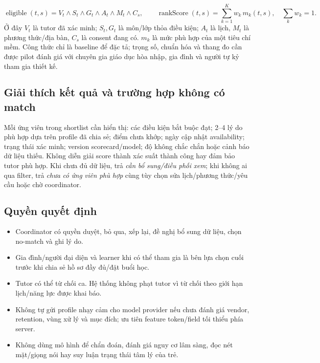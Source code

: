 \documentclass[11pt,a4paper]{article}
\begin{document}
\[
\operatorname{eligible}(t,s)=V_t\land S_t\land G_t\land A_t\land M_t\land C_s,
\qquad
\operatorname{rankScore}(t,s)=\sum_{k=1}^{K}w_k\,m_k(t,s),\quad \sum_k w_k=1.
\]
Ở đây $V_t$ là tutor đã xác minh; $S_t,G_t$ là môn/lớp thỏa điều kiện; $A_t$ là lịch, $M_t$ là phương thức/địa bàn, $C_s$ là consent đang có. $m_k$ là mức phù hợp của một tiêu chí mềm. Công thức chỉ là baseline để đặc tả; trọng số, chuẩn hóa và thang đo cần được pilot đánh giá với chuyên gia giáo dục hòa nhập, gia đình và người tự kỷ tham gia thiết kế.

\subsection{Giải thích kết quả và trường hợp không có match}
Mỗi ứng viên trong shortlist cần hiển thị: các điều kiện bắt buộc đạt; 2--4 lý do phù hợp dựa trên profile đã chia sẻ; điểm chưa khớp; ngày cập nhật availability; trạng thái xác minh; version scorecard/model; độ không chắc chắn hoặc cảnh báo dữ liệu thiếu. Không diễn giải score thành xác suất thành công hay đảm bảo tutor phù hợp. Khi chưa đủ dữ liệu, trả \emph{cần bổ sung/điều phối xem}; khi không ai qua filter, trả \emph{chưa có ứng viên phù hợp} cùng tùy chọn sửa lịch/phương thức/yêu cầu hoặc chờ coordinator.

\subsection{Quyền quyết định}
\begin{itemize}
  \item Coordinator có quyền duyệt, bỏ qua, xếp lại, đề nghị bổ sung dữ liệu, chọn no-match và ghi lý do.
  \item Gia đình/người đại diện và learner khi có thể tham gia là bên lựa chọn cuối trước khi chia sẻ hồ sơ đầy đủ/đặt buổi học.
  \item Tutor có thể từ chối ca. Hệ thống không phạt tutor vì từ chối theo giới hạn lịch/năng lực được khai báo.
  \item Không tự gửi profile nhạy cảm cho model provider nếu chưa đánh giá vendor, retention, vùng xử lý và mục đích; ưu tiên feature token/field tối thiểu phía server.
  \item Không dùng mô hình để chẩn đoán, đánh giá nguy cơ lâm sàng, đọc nét mặt/giọng nói hay suy luận trạng thái tâm lý của trẻ.
\end{itemize}
\end{document}
